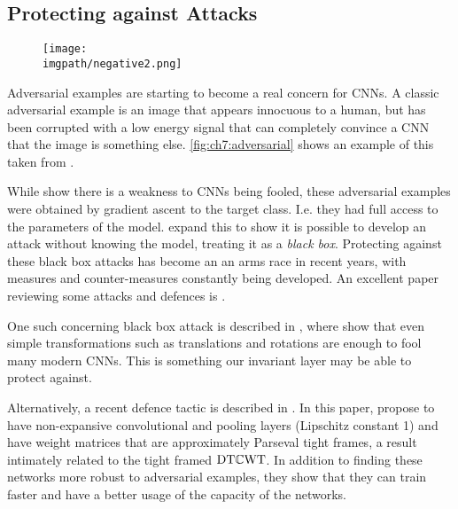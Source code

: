 \subsection{Protecting against Attacks}
\begin{figure}
  \centering
  \texttt{[image: \\imgpath/negative2.png]}
  \label{fig:ch7:adversarial}
\end{figure}
Adversarial examples are starting to become a real concern for CNNs. A classic
adversarial example is an image that appears innocuous to a human, but has been
corrupted with a low energy signal that can completely convince a CNN that the
image is something else. \autoref{fig:ch7:adversarial} shows an example of this
taken from \cite{szegedy_intriguing_2014}.

While \citeauthor{szegedy_intriguing_2014} \cite{szegedy_intriguing_2014} show
there is a weakness to CNNs being fooled, these adversarial examples were
obtained by gradient ascent to the target class. I.e. they had full access to
the parameters of the model. \citeauthor{papernot_practical_2017} \cite{papernot_practical_2017} expand this to show
it is possible to develop an attack without knowing the model, treating it as a
\emph{black box}. Protecting against these black box attacks has become an
an arms race in recent years, with measures and counter-measures constantly
being developed. An excellent paper reviewing some attacks and
defences is \cite{carlini_adversarial_2017}.

One such concerning black box attack is described in \cite{engstrom_rotation_2017}, where
\citeauthor{engstrom_rotation_2017} show that even simple transformations such
as translations and rotations are enough to fool many modern CNNs. This is
something our invariant layer may be able to protect against.

Alternatively, a recent defence tactic is described in \cite{cisse_parseval_2017}. In
this paper, \citeauthor{cisse_parseval_2017} propose to have non-expansive
convolutional and pooling layers (Lipschitz constant 1) and have weight matrices
that are approximately Parseval tight frames, a result intimately related to
the tight framed $\mathrm{DT}\mathbb{C}\mathrm{WT}$. In addition to finding these
networks more robust to adversarial examples, they show that they can train
faster and have a better usage of the capacity of the networks.

